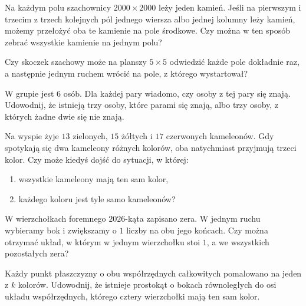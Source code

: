 \documentclass{lecture-kuznia}
\begin{document}
\begin{problem}[$\spadesuit$]\label{Z9}
	Na każdym polu szachownicy $2000\times2000$ leży jeden kamień. Jeśli na
	pierwszym i trzecim z trzech kolejnych pól jednego wiersza albo jednej
	kolumny leży kamień, możemy przełożyć oba te kamienie na pole środkowe.
	Czy można w ten sposób zebrać wszystkie kamienie na jednym polu?
\end{problem}

\begin{problem}[$\clubsuit$]\label{Z10}
	Czy skoczek szachowy może na planszy $5\times5$ odwiedzić każde pole
	dokładnie raz, a następnie jednym ruchem wrócić na pole, z którego
	wystartował?
\end{problem}

\begin{problem}[$\diamondsuit$]\label{Z11}
	W grupie jest $6$ osób. Dla każdej pary wiadomo, czy osoby z tej pary się
	znają. Udowodnij, że istnieją trzy osoby, które parami się znają, albo
	trzy osoby, z których żadne dwie się nie znają.
\end{problem}

\newpage
\begin{problem}[$\clubsuit$]\label{Z12}
	Na wyspie żyje $13$ zielonych, $15$ żółtych i $17$ czerwonych kameleonów.
	Gdy spotykają się dwa kameleony różnych kolorów, oba natychmiast przyjmują
	trzeci kolor. Czy może kiedyś dojść do sytuacji, w której:
	\begin{enumerate}[label= \alph*)]
		\item wszystkie kameleony mają ten sam kolor,
		\item każdego koloru jest tyle samo kameleonów?
	\end{enumerate}
\end{problem}

\begin{problem}[$\redheart$]\label{Z13}
	W wierzchołkach foremnego $2026$-kąta zapisano zera. W jednym ruchu
	wybieramy bok i zwiększamy o $1$ liczby na obu jego końcach. Czy można
	otrzymać układ, w którym w jednym wierzchołku stoi $1$, a we wszystkich
	pozostałych zera?
\end{problem}

\begin{problem}[$\spadesuit$]\label{Z14}
	Każdy punkt płaszczyzny o obu współrzędnych całkowitych pomalowano na jeden
	z $k$ kolorów. Udowodnij, że istnieje prostokąt o bokach równoległych do
	osi układu współrzędnych, którego cztery wierzchołki mają ten sam kolor.
\end{problem}
\end{document}
